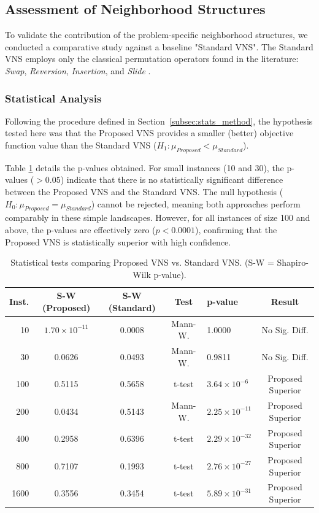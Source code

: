 \documentclass[preprint,12pt,authoryear]{elsarticle}
\begin{document}

\subsection{Assessment of Neighborhood Structures}
\label{subsec:operators_analysis}

To validate the contribution of the problem-specific neighborhood structures, we conducted a comparative study against a baseline "Standard VNS". The Standard VNS employs only the 
classical permutation operators found in the literature: \textit{Swap}, \textit{Reversion}, \textit{Insertion}, and \textit{Slide} \citep{gendreau2010}.

\subsubsection{Statistical Analysis}
Following the procedure defined in Section~\ref{subsec:stats_method}, the hypothesis tested here was that the Proposed VNS provides a smaller (better) objective
function value than the Standard VNS ($H_1: \mu_{Proposed} < \mu_{Standard}$).

Table \ref{tab:stats_vns} details the p-values obtained. For small instances (10 and 30), the p-values ($> 0.05$) indicate that there is no statistically significant difference 
between the Proposed VNS and the Standard VNS. The null hypothesis ($H_0: \mu_{Proposed} = \mu_{Standard}$) cannot be rejected, meaning both approaches perform comparably in these simple landscapes. 
However, for all instances of size 100 and above, the p-values are effectively zero ($p < 0.0001$), confirming that the Proposed VNS is statistically superior with high confidence.

\begin{table}[h]
    \centering
    \small
    \caption{Statistical tests comparing Proposed VNS vs. Standard VNS. (S-W = Shapiro-Wilk p-value).}
    \label{tab:stats_vns}
    \begin{tabular}{rccclc}
        \toprule
        Inst. & S-W (Proposed) & S-W (Standard) & Test & p-value & Result \\
        \midrule
        10 & $1.70 \times 10^{-11}$ & 0.0008 & Mann-W. & 1.0000 & No Sig. Diff. \\
        30 & 0.0626 & 0.0493 & Mann-W. & 0.9811 & No Sig. Diff. \\
        100 & 0.5115 & 0.5658 & t-test & $3.64 \times 10^{-6}$ & Proposed Superior \\
        200 & 0.0434 & 0.5143 & Mann-W. & $2.25 \times 10^{-11}$ & Proposed Superior \\
        400 & 0.2958 & 0.6396 & t-test & $2.29 \times 10^{-32}$ & Proposed Superior \\
        800 & 0.7107 & 0.1993 & t-test & $2.76 \times 10^{-27}$ & Proposed Superior \\
        1600 & 0.3556 & 0.3454 & t-test & $5.89 \times 10^{-31}$ & Proposed Superior \\
        \bottomrule
    \end{tabular}
\end{table}
\end{document}
